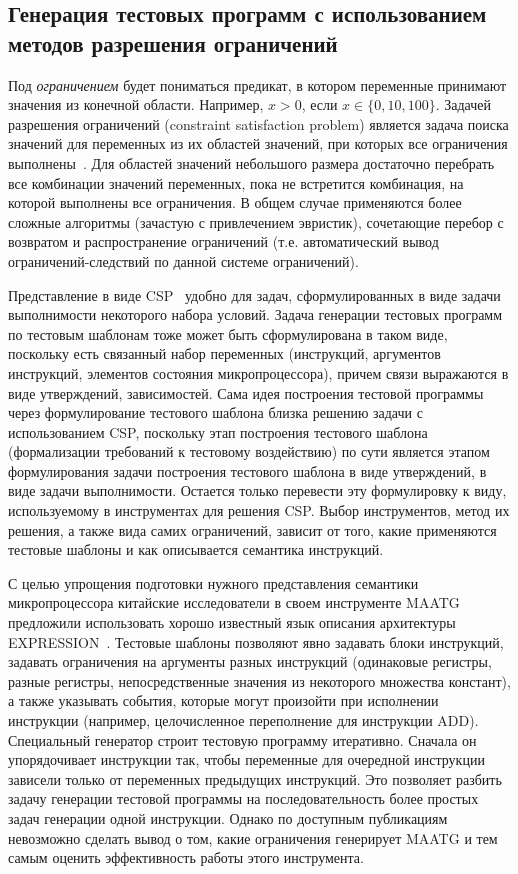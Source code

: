 
\subsection{Генерация тестовых программ с использованием методов
разрешения ограничений}

Под \emph{ограничением} будет пониматься предикат, в котором
переменные принимают значения из конечной области. Например, $x >
0$, если $x \in \{0, 10, 100\}$. Задачей разрешения ограничений
(constraint satisfaction problem) является задача поиска значений
для переменных из их областей значений, при которых все ограничения
выполнены~\cite{CSP}. Для областей значений небольшого размера
достаточно перебрать все комбинации значений переменных, пока не
встретится комбинация, на которой выполнены все ограничения. В общем
случае применяются более сложные алгоритмы (зачастую с привлечением
эвристик), сочетающие перебор с возвратом и распространение
ограничений (т.е. автоматический вывод ограничений-следствий по
данной системе ограничений).

Представление в виде CSP~\cite{CSP} удобно для задач,
сформулированных в виде задачи выполнимости некоторого набора
условий. Задача генерации тестовых программ по тестовым шаблонам
тоже может быть сформулирована в таком виде, поскольку есть
связанный набор переменных (инструкций, аргументов инструкций,
элементов состояния микропроцессора), причем связи выражаются в виде
утверждений, зависимостей. Сама идея построения тестовой программы
через формулирование тестового шаблона близка решению задачи с
использованием CSP, поскольку этап построения тестового шаблона
(формализации требований к тестовому воздействию) по сути является
этапом формулирования задачи построения тестового шаблона в виде
утверждений, в виде задачи выполнимости. Остается только перевести
эту формулировку к виду, используемому в инструментах для решения
CSP. Выбор инструментов, метод их решения, а также вида самих
ограничений, зависит от того, какие применяются тестовые шаблоны и
как описывается семантика инструкций.

С целью упрощения подготовки нужного представления семантики
микропроцессора китайские исследователи в своем инструменте
\textsc{MAATG}~\cite{MAATG} предложили использовать хорошо известный
язык описания архитектуры EXPRESSION~\cite{EXPRESSION}. Тестовые
шаблоны позволяют явно задавать блоки инструкций, задавать
ограничения на аргументы разных инструкций (одинаковые регистры,
разные регистры, непосредственные значения из некоторого множества
констант), а также указывать события, которые могут произойти при
исполнении инструкции (например, целочисленное переполнение для
инструкции ADD). Специальный генератор строит тестовую программу
итеративно. Сначала он упорядочивает инструкции так, чтобы
переменные для очередной инструкции зависели только от переменных
предыдущих инструкций. Это позволяет разбить задачу генерации
тестовой программы на последовательность более простых задач
генерации одной инструкции. Однако по доступным публикациям
невозможно сделать вывод о том, какие ограничения генерирует MAATG и
тем самым оценить эффективность работы этого инструмента.

